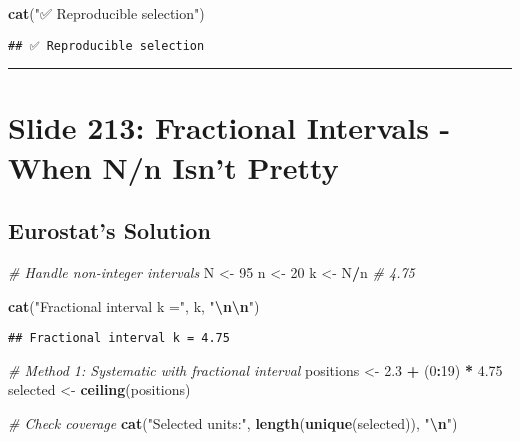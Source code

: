 \documentclass[
]{article}
\newenvironment{Shaded}{\begin{snugshade}}{\end{snugshade}}
\newcommand{\CommentTok}[1]{\textcolor[rgb]{0.56,0.35,0.01}{\textit{#1}}}
\newcommand{\DecValTok}[1]{\textcolor[rgb]{0.00,0.00,0.81}{#1}}
\newcommand{\FloatTok}[1]{\textcolor[rgb]{0.00,0.00,0.81}{#1}}
\newcommand{\FunctionTok}[1]{\textcolor[rgb]{0.13,0.29,0.53}{\textbf{#1}}}
\newcommand{\NormalTok}[1]{#1}
\newcommand{\OtherTok}[1]{\textcolor[rgb]{0.56,0.35,0.01}{#1}}
\newcommand{\SpecialCharTok}[1]{\textcolor[rgb]{0.81,0.36,0.00}{\textbf{#1}}}
\newcommand{\StringTok}[1]{\textcolor[rgb]{0.31,0.60,0.02}{#1}}
\begin{document}
\begin{Shaded}
\begin{Highlighting}[]
\FunctionTok{cat}\NormalTok{(}\StringTok{"✅ Reproducible selection"}\NormalTok{)}
\end{Highlighting}
\end{Shaded}

\begin{verbatim}
## ✅ Reproducible selection
\end{verbatim}

\begin{center}\rule{0.5\linewidth}{0.5pt}\end{center}

\section{Slide 213: Fractional Intervals - When N/n Isn't
Pretty}\label{slide-213-fractional-intervals---when-nn-isnt-pretty}

\subsection{Eurostat's Solution}\label{eurostats-solution}

\begin{Shaded}
\begin{Highlighting}[]
\CommentTok{\# Handle non{-}integer intervals}
\NormalTok{N }\OtherTok{\textless{}{-}} \DecValTok{95}
\NormalTok{n }\OtherTok{\textless{}{-}} \DecValTok{20}
\NormalTok{k }\OtherTok{\textless{}{-}}\NormalTok{ N}\SpecialCharTok{/}\NormalTok{n  }\CommentTok{\# 4.75}

\FunctionTok{cat}\NormalTok{(}\StringTok{"Fractional interval k ="}\NormalTok{, k, }\StringTok{"}\SpecialCharTok{\textbackslash{}n\textbackslash{}n}\StringTok{"}\NormalTok{)}
\end{Highlighting}
\end{Shaded}

\begin{verbatim}
## Fractional interval k = 4.75
\end{verbatim}

\begin{Shaded}
\begin{Highlighting}[]
\CommentTok{\# Method 1: Systematic with fractional interval}
\NormalTok{positions }\OtherTok{\textless{}{-}} \FloatTok{2.3} \SpecialCharTok{+}\NormalTok{ (}\DecValTok{0}\SpecialCharTok{:}\DecValTok{19}\NormalTok{) }\SpecialCharTok{*} \FloatTok{4.75}
\NormalTok{selected }\OtherTok{\textless{}{-}} \FunctionTok{ceiling}\NormalTok{(positions)}

\CommentTok{\# Check coverage}
\FunctionTok{cat}\NormalTok{(}\StringTok{"Selected units:"}\NormalTok{, }\FunctionTok{length}\NormalTok{(}\FunctionTok{unique}\NormalTok{(selected)), }\StringTok{"}\SpecialCharTok{\textbackslash{}n}\StringTok{"}\NormalTok{)}
\end{Highlighting}
\end{Shaded}
\end{document}
